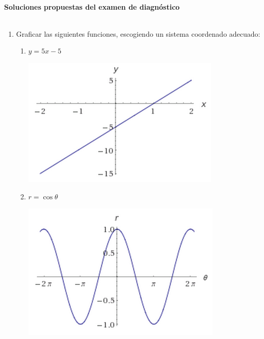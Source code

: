 \documentclass[a4paper,12pt]{article}
\begin{document}

\begin{center}
\HRule \\[0.4cm]
{ \bfseries Soluciones propuestas del examen de diagn\'ostico}\\ %
\HRule \\[0.4cm]
\end{center}


\begin{enumerate}

 \item Graficar las siguientes funciones, escogiendo un sistema coordenado adecuado:
 \begin{enumerate}
  \item $y=5x-5$ 
\begin{center}
 \includegraphics[scale=0.4]{figure1}
\end{center}

  \item $r=\cos\theta$
\begin{center}
 \includegraphics[scale=0.4]{figure2}
\end{center}


\end{enumerate}
\end{enumerate}
\end{document}
